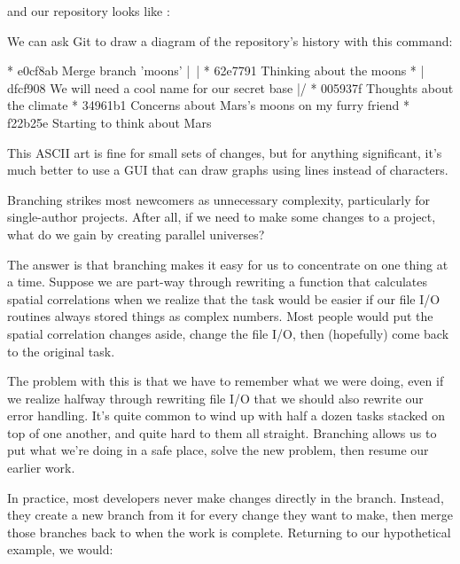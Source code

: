 and our repository looks like :


We can ask Git to draw a diagram of the repository's history with this
command:


\begin{VerbOut}
*   e0cf8ab Merge branch 'moons'
|\
| * 62e7791 Thinking about the moons
* | dfcf908 We will need a cool name for our secret base
|/
* 005937f Thoughts about the climate
* 34961b1 Concerns about Mars's moons on my furry friend
* f22b25e Starting to think about Mars
\end{VerbOut}

This ASCII art is fine for small sets of changes, but for anything
significant, it's much better to use a GUI that can draw graphs using
lines instead of characters.

Branching strikes most newcomers as unnecessary complexity, particularly
for single-author projects. After all, if we need to make some changes
to a project, what do we gain by creating parallel universes?

The answer is that branching makes it easy for us to concentrate on one
thing at a time. Suppose we are part-way through rewriting a function
that calculates spatial correlations when we realize that the task would
be easier if our file I/O routines always stored things as complex
numbers. Most people would put the spatial correlation changes aside,
change the file I/O, then (hopefully) come back to the original task.

The problem with this is that we have to remember what we were doing,
even if we realize halfway through rewriting file I/O that we should
also rewrite our error handling. It's quite common to wind up with half
a dozen tasks stacked on top of one another, and quite hard to them all
straight. Branching allows us to put what we're doing in a safe place,
solve the new problem, then resume our earlier work.

In practice, most developers never make changes directly in the
 branch. Instead, they create a new branch from it for
every change they want to make, then merge those branches back to
\code{master} when the work is complete. Returning to our hypothetical
example, we would:

